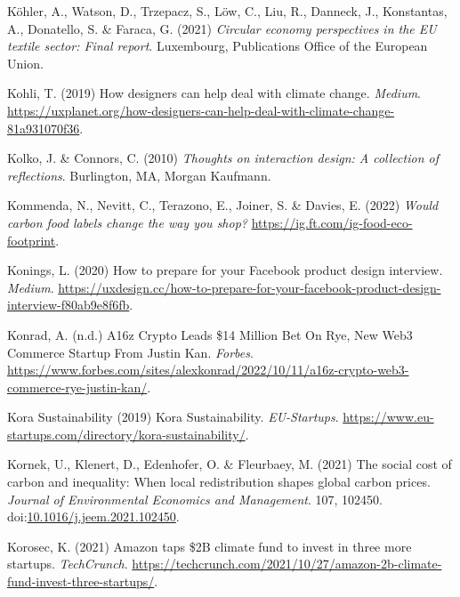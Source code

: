 \documentclass[
  letterpaper,
  DIV=11,
  numbers=noendperiod]{scrartcl}
\newlength{\cslhangindent}
\newenvironment{CSLReferences}[2] %
 {\begin{list}{}{%
  \setlength{\itemindent}{0pt}
  \setlength{\leftmargin}{0pt}
  \setlength{\parsep}{0pt}
  \ifodd #1
   \setlength{\leftmargin}{\cslhangindent}
   \setlength{\itemindent}{-1\cslhangindent}
  \fi
  \setlength{\itemsep}{#2\baselineskip}}}
 {\end{list}}
\begin{document}
\begin{CSLReferences}{0}{1}
Köhler, A., Watson, D., Trzepacz, S., Löw, C., Liu, R., Danneck, J.,
Konstantas, A., Donatello, S. \& Faraca, G. (2021) \emph{Circular
economy perspectives in the {EU} textile sector: Final report}.
Luxembourg, Publications Office of the European Union.

Kohli, T. (2019) How designers can help deal with climate change.
\emph{Medium}.
\url{https://uxplanet.org/how-designers-can-help-deal-with-climate-change-81a931070f36}.

Kolko, J. \& Connors, C. (2010) \emph{Thoughts on interaction design: A
collection of reflections}. Burlington, MA, Morgan Kaufmann.

Kommenda, N., Nevitt, C., Terazono, E., Joiner, S. \& Davies, E. (2022)
\emph{Would carbon food labels change the way you shop?}
\url{https://ig.ft.com/ig-food-eco-footprint}.

Konings, L. (2020) How to prepare for your {Facebook} product design
interview. \emph{Medium}.
\url{https://uxdesign.cc/how-to-prepare-for-your-facebook-product-design-interview-f80ab9e8f6fb}.

Konrad, A. (n.d.) A16z {Crypto Leads} \$14 {Million Bet On Rye}, {New
Web3 Commerce Startup From Justin Kan}. \emph{Forbes}.
\url{https://www.forbes.com/sites/alexkonrad/2022/10/11/a16z-crypto-web3-commerce-rye-justin-kan/}.

Kora Sustainability (2019) Kora {Sustainability}. \emph{EU-Startups}.
\url{https://www.eu-startups.com/directory/kora-sustainability/}.

Kornek, U., Klenert, D., Edenhofer, O. \& Fleurbaey, M. (2021) The
social cost of carbon and inequality: {When} local redistribution shapes
global carbon prices. \emph{Journal of Environmental Economics and
Management}. 107, 102450.
doi:\href{https://doi.org/10.1016/j.jeem.2021.102450}{10.1016/j.jeem.2021.102450}.

Korosec, K. (2021) Amazon taps \${2B} climate fund to invest in three
more startups. \emph{TechCrunch}.
\url{https://techcrunch.com/2021/10/27/amazon-2b-climate-fund-invest-three-startups/}.


\end{CSLReferences}
\end{document}

